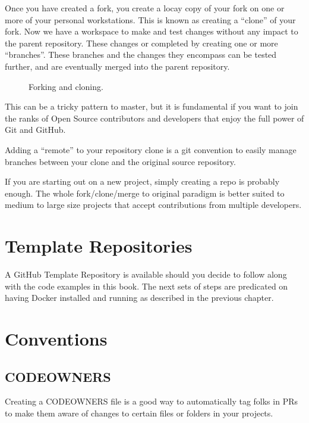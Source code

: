 \justify{}
Once you have created a fork, you create a locay copy of your fork on one or more of your personal workstations. This is
known as creating a ``clone'' of your fork. Now we have a workspace to make and test changes without
any impact to the parent repository. These changes or completed by creating one or more ``branches''. These branches and the
changes they encompass can be tested further, and are eventually merged into the parent repository.

\begin{figure}[!htb]
\centering

\caption{Forking and cloning.}
\label{forkandclone}
\end{figure}

\justify{}
This can be a tricky pattern to master, but it is fundamental if you
want to join the ranks of Open Source contributors and developers that
enjoy the full power of Git and GitHub.

\justify{}
Adding a ``remote'' to your repository clone is a git convention to easily manage branches between your clone and
the original source repository.

\justify{}
If you are starting out on a new project, simply creating a repo is probably enough. The whole fork/clone/merge to original
paradigm is better suited to medium to large size projects that accept contributions from multiple developers.


\section{Template Repositories}

\justify{}
A GitHub Template Repository is available should you decide to follow along with the code examples in this book. The next sets of steps are
predicated on having Docker installed and running as described in the previous chapter.


\section{Conventions}

\subsection{CODEOWNERS}

\justify{}
Creating a CODEOWNERS file is a good way to automatically tag folks in PRs to make them aware of
changes to certain files or folders in your projects.

